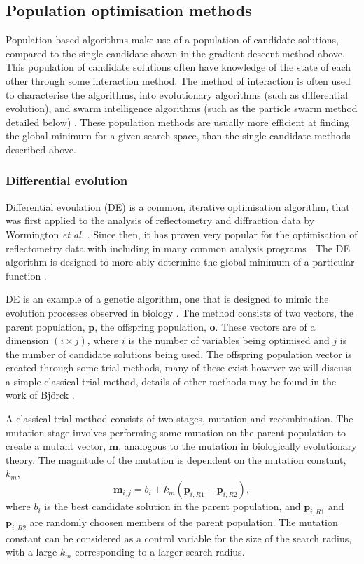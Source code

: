 \subsection{Population optimisation methods}
Population-based algorithms make use of a population of candidate solutions, compared to the single candidate shown in the gradient descent method above.
This population of candidate solutions often have knowledge of the state of each other through some interaction method.
The method of interaction is often used to characterise the algorithms, into evolutionary algorithms (such as differential evolution), and swarm intelligence algorithms (such as the particle swarm method detailed below) \cite{wu_ensemble_2019}.
These population methods are usually more efficient at finding the global minimum for a given search space, than the single candidate methods described above.

\subsubsection{Differential evolution}
\label{sec:de}
Differential evoulation (DE) is a common, iterative optimisation algorithm, that was first applied to the analysis of reflectometry and diffraction data by Wormington \emph{et al.} \cite{wormington_characterization_1999}.
Since then, it has proven very popular for the optimisation of reflectometry data with including in many common analysis programs \cite{bjorck_fitting_2011,bjorck_genx_2007,nelson_co-refinement_2006,nelson_refnx_2019,ott_simulreflec_nodate,kienzle_ncnr_nodate}.
The DE algorithm is designed to more ably determine the global minimum of a particular function \cite{storn_differential_1997}.

DE is an example of a genetic algorithm, one that is designed to mimic the evolution processes observed in biology \cite{holland_adaptation_1992}.
The method consists of two vectors, the parent population, $\mathbf{p}$, the offspring population, $\mathbf{o}$.
These vectors are of a dimension $(i\times j)$, where $i$ is the number of variables being optimised and $j$ is the number of candidate solutions being used.
The offspring population vector is created through some trial methods, many of these exist however we will discuss a simple classical trial method, details of other methods may be found in the work of Bj\"{o}rck \cite{bjorck_fitting_2011}.

A classical trial method consists of two stages, mutation and recombination.
The mutation stage involves performing some mutation on the parent population to create a mutant vector, $\mathbf{m}$, analogous to the mutation in biologically evolutionary theory.
The magnitude of the mutation is dependent on the mutation constant, $k_m$,
%
\begin{equation}
\mathbf{m}_{i,j}= b_{i} + k_m(\mathbf{p}_{i,R1} - \mathbf{p}_{i,R2}),
\end{equation}
%
where $b_{i}$ is the best candidate solution in the parent population, and $\mathbf{p}_{i,R1}$ and $\mathbf{p}_{i,R2}$ are randomly choosen members of the parent population.
The mutation constant can be considered as a control variable for the size of the search radius, with a large $k_m$ corresponding to a larger search radius.

